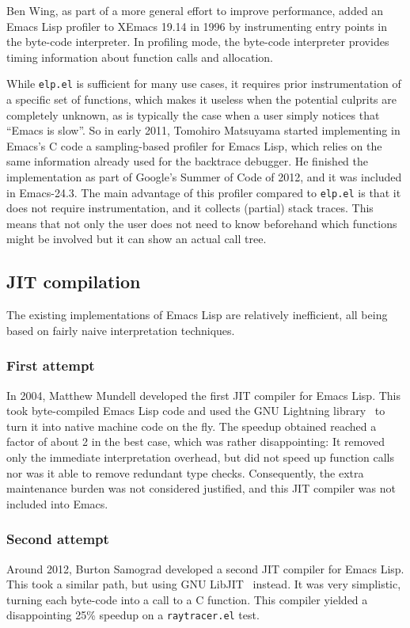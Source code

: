 \documentclass[format=acmsmall, review]{acmart}
\newcommand \Elisp {Emacs Lisp}
\begin{document}
Ben Wing, as part of a more general effort to improve performance, added an \Elisp{} profiler to XEmacs 19.14 in
1996 by instrumenting entry points in the byte-code interpreter.
In profiling mode, the byte-code interpreter provides timing
information about function calls and allocation.

While \texttt{elp.el} is sufficient for many use cases, it requires prior
instrumentation of a specific set of functions, which makes it useless when
the potential culprits are completely unknown, as is typically the case when
a user simply notices that ``Emacs is slow''.
So in early 2011, Tomohiro Matsuyama started implementing in Emacs's C code
a sampling-based profiler for \Elisp{}, which relies on the same information
already used for the backtrace debugger.  He finished the implementation as
part of Google's Summer of Code of 2012, and it was included in Emacs-24.3.
The main advantage of this profiler compared to \texttt{elp.el} is that it
does not require instrumentation, and it collects (partial) stack traces.
This means that not only the user does not need to know beforehand which
functions might be involved but it can show an actual call tree.

\subsection{JIT compilation}
\label{sec:jit}

The existing implementations of \Elisp{} are relatively inefficient, all
being based on fairly naive interpretation techniques.

\subsubsection*{First attempt}
In 2004, Matthew Mundell developed the first JIT compiler for \Elisp.
This took byte-compiled \Elisp{} code and used the GNU Lightning
library~\cite{GNULightning} to turn it into native machine code on the
fly.  The speedup obtained reached a factor of about 2 in the best
case, which was rather disappointing: It removed only the immediate
interpretation overhead, but did not speed up function calls nor was it
able to remove redundant type checks.  Consequently, the extra
maintenance burden was not considered justified, and this JIT compiler
was not included into Emacs.

\subsubsection*{Second attempt}
Around 2012, Burton Samograd developed a second JIT compiler for \Elisp.
This took a similar path, but using GNU LibJIT~\cite{GNULibjit} instead.
It was very simplistic, turning each byte-code into a call to a C function.
This compiler yielded a disappointing 25\% speedup on
a \texttt{raytracer.el} test.
\end{document}
